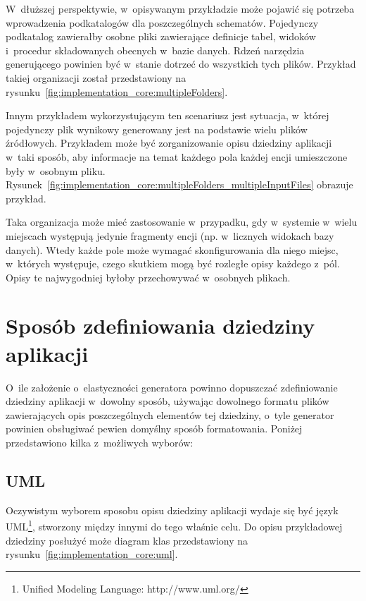W~dłuższej perspektywie, w~opisywanym przykładzie może pojawić się potrzeba wprowadzenia podkatalogów dla poszczególnych schematów.
Pojedynczy podkatalog zawierałby osobne pliki zawierające definicje tabel, widoków i~procedur składowanych obecnych w~bazie danych.
Rdzeń narzędzia generującego powinien być w~stanie dotrzeć do wszystkich tych plików.
Przykład takiej organizacji został przedstawiony na rysunku~\ref{fig:implementation_core:multipleFolders}.



Innym przykładem wykorzystującym ten scenariusz jest sytuacja, w~której pojedynczy plik wynikowy generowany jest na podstawie wielu plików źródłowych.
Przykładem może być zorganizowanie opisu dziedziny aplikacji w~taki sposób, aby informacje na temat każdego pola każdej encji umieszczone były w~osobnym pliku.
Rysunek~\ref{fig:implementation_core:multipleFolders_multipleInputFiles} obrazuje przykład.



Taka organizacja może mieć zastosowanie w~przypadku, gdy w~systemie w~wielu miejscach występują jedynie fragmenty encji (np. w~licznych widokach bazy danych).
Wtedy każde pole może wymagać skonfigurowania dla niego miejsc, w~których występuje, czego skutkiem mogą być rozległe opisy każdego z~pól.
Opisy te najwygodniej byłoby przechowywać w~osobnych plikach.



\section{Sposób zdefiniowania dziedziny aplikacji} \label{sec:core:domain_definition}

O~ile założenie o~elastyczności generatora powinno dopuszczać zdefiniowanie dziedziny aplikacji w~dowolny sposób, używając dowolnego formatu plików zawierających opis poszczególnych elementów tej dziedziny, o~tyle generator powinien obsługiwać pewien domyślny sposób formatowania.
Poniżej przedstawiono kilka z~możliwych wyborów:

\subsection{UML}

Oczywistym wyborem sposobu opisu dziedziny aplikacji wydaje się być język UML\footnote{Unified Modeling Language: http://www.uml.org/}, stworzony między innymi do tego właśnie celu.
Do opisu przykładowej dziedziny posłużyć może diagram klas przedstawiony na rysunku~\ref{fig:implementation_core:uml}.

